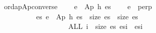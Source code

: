 \documentclass{llncs}
\newenvironment{isacode}
{\begin{list}{}{
\setlength{\leftmargin}{4pt}
\setlength{\rightmargin}{0pt}
\setlength{\listparindent}{0pt}\raggedright
\setlength{\itemsep}{0pt}
\setlength{\parsep}{0pt}
\normalfont\ttfamily }\item[]}
{\end{list}}
\begin{document}
\begin{minipage}{\linewidth}
\begin{isacode}
\isamarkupfalse \ ordapAp{\isacharunderscore}converse{\isacharcolon}\isanewline
\ \ \ \ {\isachardoublequoteopen}e{\isacharprime}\ {\isasymsqsubseteq}\ Ap\ h\ es{\isachardoublequoteclose}\isanewline
\ \ \ \ {\isachardoublequoteopen}e{\isacharprime}\ {\isacharequal}\ perp\ {\isasymor}\isanewline
\ \ \ \ \ \ \ \ \ \ {\isacharparenleft}{\isasymexists}es{\isacharprime}{\isachardot}\ e{\isacharprime}\ {\isacharequal}\ Ap\ h\ es{\isacharprime}\ {\isasymand}\ size\ es\ {\isacharequal}\ size\ es{\isacharprime}\isanewline
\ \ \ \ \ \ \ \ \ \ \ \ \ \ \ \ \ \ {\isasymand}\ {\isacharparenleft}ALL\ i\ {\isacharless}\ size\ es{\isachardot}\ es{\isacharprime}{\isacharbang}i\ {\isasymsqsubseteq}\ es{\isacharbang}i{\isacharparenright}{\isacharparenright}{\isachardoublequoteclose}
\end{isacode}
\end{minipage}

\medskip
\end{document}
